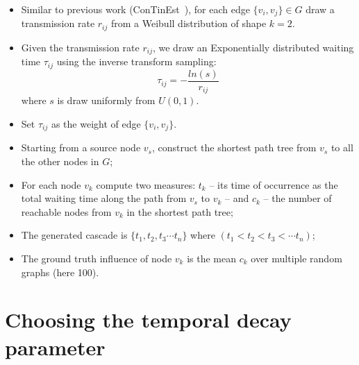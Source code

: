 \begin{itemize}
	\item Similar to previous work (ConTinEst~\cite{Du2013}), for each edge $\{v_i, v_j\} \in G$ draw a transmission rate $r_{ij}$ from a Weibull distribution of shape $k = 2$.
	\item Given the transmission rate $r_{ij}$, we draw an Exponentially distributed waiting time $\tau_{ij}$ using the inverse transform sampling:
		$$\tau_{ij} = -\frac{ln(s)}{r_{ij}}$$  
	where $s$ is draw uniformly from $U(0,1)$.
	\item Set $\tau_{ij}$ as the weight of edge $\{v_i, v_j\}$.
	\item Starting from a source node $v_s$, construct the shortest path tree from $v_s$ to all the other nodes in $G$;
	\item For each node $v_k$ compute two measures:
		$t_k$ -- its time of occurrence as the total waiting time along the path from $v_s$ to $v_k$ -- and
		$c_k$ -- the number of reachable nodes from $v_k$ in the shortest path tree;
	\item The generated cascade is $\{t_1,t_2,t_3 \cdots t_n\}$  where $(t_1 < t_2 < t_3 < \cdots t_n)$;
	\item The ground truth influence of node $v_k$ is the mean $c_k$ over multiple random graphs (here 100).
\end{itemize}

\section{Choosing the temporal decay parameter}
\label{si-sec:choose-temp-decay}

